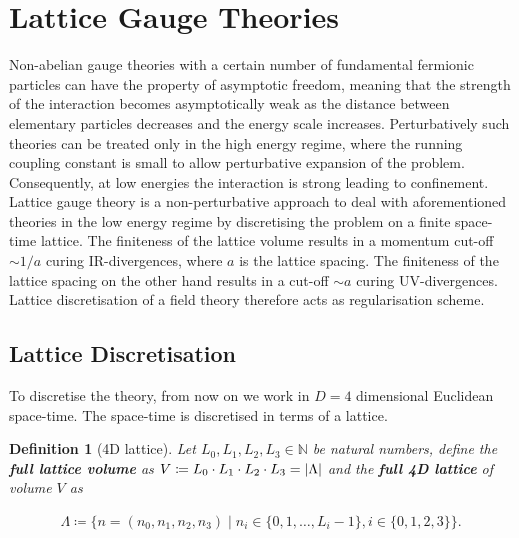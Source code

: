 \documentclass{article}
\theoremstyle{plain} %
\newtheorem{definition}{Definition}[section]
\theoremstyle{convention} %
\theoremstyle{remark} %
\def\df#1{\textbf{\textit{#1}}}
\numberwithin{equation}{section}
\begin{document}
\newpage

\section{Lattice Gauge Theories}

\label{sec:lattice_gauge_theories}

Non-abelian gauge theories with a certain number of fundamental fermionic particles can have the property of asymptotic freedom, meaning that the strength of the interaction becomes asymptotically weak as the distance between elementary particles decreases and the energy scale increases. Perturbatively such theories can be treated only in the high energy regime, where the running coupling constant is small to allow perturbative expansion of the problem. Consequently, at low energies the interaction is strong leading to confinement. Lattice gauge theory is a non-perturbative approach to deal with aforementioned theories in the low energy regime by discretising the problem on a finite space-time lattice. The finiteness of the lattice volume results in a momentum cut-off $\sim 1/a$ curing IR-divergences, where $a$ is the lattice spacing. The finiteness of the lattice spacing on the other hand results in a cut-off $\sim a$ curing UV-divergences. Lattice discretisation of a field theory therefore acts as regularisation scheme.

\subsection{Lattice Discretisation}

To discretise the theory, from now on we work in $D=4$ dimensional Euclidean space-time. The space-time is discretised in terms of a lattice.

\begin{definition}[4D lattice]

Let $L_0, L_1, L_2, L_3 \in \mathbb{N}$ be natural numbers, define the \df{full lattice volume} as $V \coloneqq L_0 \cdot L_1 \cdot L_2 \cdot L_3 = \abs{\Lambda}$ and the \df{full 4D lattice} of volume $V$ as

\begin{align*}
    \Lambda \coloneqq \{ n = (n_0, n_1, n_2, n_3) \mid n_i \in \{0, 1, \dots, L_i - 1 \}, i \in \{0,1,2,3\} \}.
\end{align*}

\end{definition}
\end{document}
